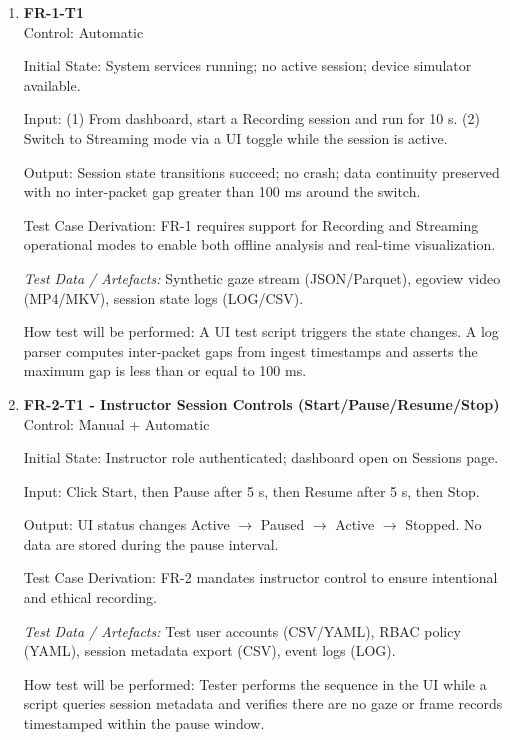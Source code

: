 \documentclass[12pt, titlepage]{article}
\begin{document}
\begin{enumerate}

\item \textbf{FR-1-T1} \\

Control: Automatic

Initial State: System services running; no active session; device simulator available.

Input: (1) From dashboard, start a Recording session and run for 10 s. (2) Switch to Streaming mode via a UI toggle while the session is active.

Output: Session state transitions succeed; no crash; data continuity preserved with no inter-packet gap greater than 100 ms around the switch.

Test Case Derivation: FR-1 requires support for Recording and Streaming operational modes to enable both offline analysis and real-time visualization.

\textit{Test Data / Artefacts:} Synthetic gaze stream (JSON/Parquet), egoview video (MP4/MKV), session state logs (LOG/CSV).

How test will be performed: A UI test script triggers the state changes. A log parser computes inter-packet gaps from ingest timestamps and asserts the maximum gap is less than or equal to 100 ms.

\item \textbf{FR-2-T1 - Instructor Session Controls (Start/Pause/Resume/Stop)} \\

Control: Manual + Automatic

Initial State: Instructor role authenticated; dashboard open on Sessions page.

Input: Click Start, then Pause after 5 s, then Resume after 5 s, then Stop.

Output: UI status changes Active $\rightarrow$ Paused $\rightarrow$ Active $\rightarrow$ Stopped. No data are stored during the pause interval.

Test Case Derivation: FR-2 mandates instructor control to ensure intentional and ethical recording.

\textit{Test Data / Artefacts:} Test user accounts (CSV/YAML), RBAC policy (YAML), session metadata export (CSV), event logs (LOG).

How test will be performed: Tester performs the sequence in the UI while a script queries session metadata and verifies there are no gaze or frame records timestamped within the pause window.


\end{enumerate}
\end{document}

